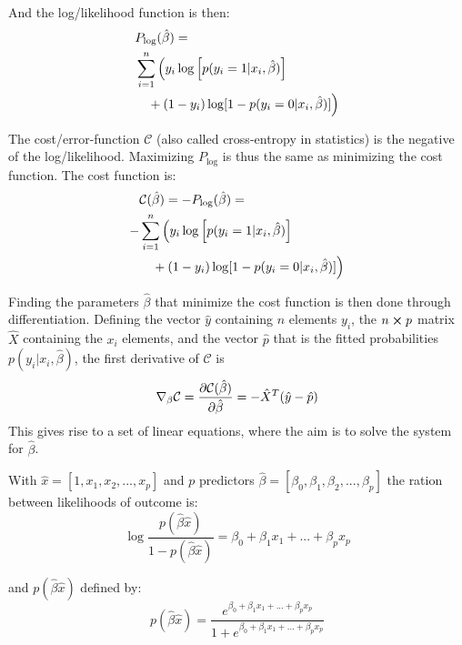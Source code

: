 And the log/likelihood function is then:
\begin{equation}
\begin{split}
    &P_{\log}(\hat{\beta}) = \\
    &\sum_{i=1}^n \Big(y_i \log \qty[p(y_i = 1|x_i,\hat{\beta})] \\
    &\quad+ (1-y_i) \log [1 - p(y_i = 0|x_i,\hat{\beta})]\Big)
\end{split}
\label{eq:log_p}
\end{equation}

The cost/error-function $\mathcal{C}$ (also called cross-entropy in statistics) is the negative of the log/likelihood. Maximizing $P_{\log}$ is thus the same as minimizing the cost function. The cost function is:
\begin{equation}
  \begin{split}
    &\mathcal{C}(\hat{\beta}) = - P_{\log}(\hat{\beta}) =  \\
    -&\sum_{i=1}^n \Big(y_i \log \qty[p(y_i = 1|x_i,\hat{\beta})] \\
    &\quad+ (1-y_i) \log [1 - p(y_i = 0|x_i,\hat{\beta})]\Big)
  \end{split}
  \label{eq:cost_function}
\end{equation}

Finding the parameters $\hat{\beta}$ that minimize the cost function is then done through differentiation.
Defining the vector $\hat{y}$ containing $n$ elements $y_i$, the $n \cross p$ matrix $\hat{X}$ containing the $x_i$ elements, and the vector $\hat{p}$ that is the fitted probabilities $p(y_i|x_i,\hat{\beta})$, the first derivative of $\mathcal{C}$ is
\begin{equation}
  \nabla_\beta \mathcal{C} = \pdv{\mathcal{C}(\hat{\beta})}{\hat{\beta}} = - \hat{X}^T (\hat{y}-\hat{p})
  \label{eq:cost_d}
\end{equation}
This gives rise to a set of linear equations, where the aim is to solve the system for $\hat{\beta}$.

With $\hat{x} = [1, x_1,x_2,...,x_p]$ and $p$ predictors $\hat{\beta} = [\beta_0,\beta_1,\beta_2,...,\beta_p]$ the ration between likelihoods of outcome is:
\begin{equation}
  \log \frac{p(\hat{\beta}\hat{x})}{1-p(\hat{\beta}\hat{x})} = \beta_0 + \beta_1x_1 + ... + \beta_px_p
  \label{eq:prob_ratio}
\end{equation}

\noindent and $p(\hat{\beta}\hat{x})$ defined by:
\begin{equation}
  p(\hat{\beta}\hat{x}) = \frac{e^{\beta_0 + \beta_1x_1 + ... + \beta_px_p}}{1+e^{\beta_0 + \beta_1x_1 + ... + \beta_px_p}}
  \label{eq:pBx}
\end{equation}

